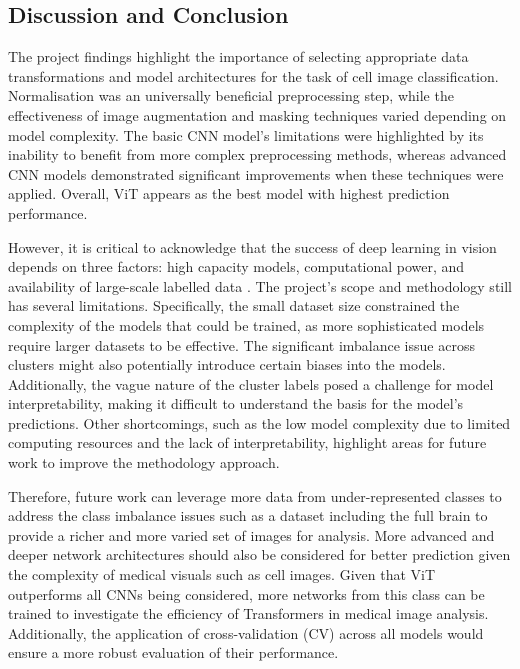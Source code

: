 \documentclass[letterpaper,9pt,twocolumn,twoside,]{pinp}
\begin{document}
\hypertarget{discussion-and-conclusion}{%
\subsection{Discussion and Conclusion}\label{discussion-and-conclusion}}

The project findings highlight the importance of selecting appropriate
data transformations and model architectures for the task of cell image
classification. Normalisation was an universally beneficial
preprocessing step, while the effectiveness of image augmentation and
masking techniques varied depending on model complexity. The basic CNN
model's limitations were highlighted by its inability to benefit from
more complex preprocessing methods, whereas advanced CNN models
demonstrated significant improvements when these techniques were
applied. Overall, ViT appears as the best model with highest prediction
performance.

However, it is critical to acknowledge that the success of deep learning
in vision depends on three factors: high capacity models, computational
power, and availability of large-scale labelled data
\citep{sun2017revisiting}. The project's scope and methodology still has
several limitations. Specifically, the small dataset size constrained
the complexity of the models that could be trained, as more
sophisticated models require larger datasets to be effective. The
significant imbalance issue across clusters might also potentially
introduce certain biases into the models. Additionally, the vague nature
of the cluster labels posed a challenge for model interpretability,
making it difficult to understand the basis for the model's predictions.
Other shortcomings, such as the low model complexity due to limited
computing resources and the lack of interpretability, highlight areas
for future work to improve the methodology approach.

Therefore, future work can leverage more data from under-represented
classes to address the class imbalance issues such as a dataset
including the full brain to provide a richer and more varied set of
images for analysis. More advanced and deeper network architectures
should also be considered for better prediction given the complexity of
medical visuals such as cell images. Given that ViT outperforms all CNNs
being considered, more networks from this class can be trained to
investigate the efficiency of Transformers in medical image analysis.
Additionally, the application of cross-validation (CV) across all models
would ensure a more robust evaluation of their performance.
\end{document}
